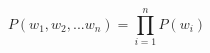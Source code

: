 \begin{equation}
P(w_{1},w_{2}, ... w_{n})= \prod_{i=1}^{n}P(w_{i})
\label{eq:unigram_lm} 
\end{equation}

